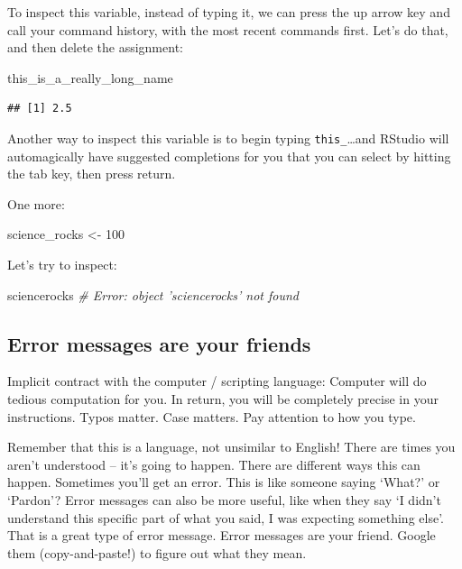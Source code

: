 \documentclass[]{book}
\newenvironment{Shaded}{\begin{snugshade}}{\end{snugshade}}
\newcommand{\DecValTok}[1]{\textcolor[rgb]{0.00,0.00,0.81}{{#1}}}
\newcommand{\StringTok}[1]{\textcolor[rgb]{0.31,0.60,0.02}{{#1}}}
\newcommand{\CommentTok}[1]{\textcolor[rgb]{0.56,0.35,0.01}{\textit{{#1}}}}
\newcommand{\NormalTok}[1]{{#1}}
\theoremstyle{definition}
\theoremstyle{definition}
\theoremstyle{definition}
\theoremstyle{remark}
\begin{document}
To inspect this variable, instead of typing it, we can press the up
arrow key and call your command history, with the most recent commands
first. Let's do that, and then delete the assignment:

\begin{Shaded}
\begin{Highlighting}[]
\NormalTok{this_is_a_really_long_name}
\end{Highlighting}
\end{Shaded}

\begin{verbatim}
## [1] 2.5
\end{verbatim}

Another way to inspect this variable is to begin typing
\texttt{this\_}\ldots{}and RStudio will automagically have suggested
completions for you that you can select by hitting the tab key, then
press return.

One more:

\begin{Shaded}
\begin{Highlighting}[]
\NormalTok{science_rocks <-}\StringTok{ }\DecValTok{100}
\end{Highlighting}
\end{Shaded}

Let's try to inspect:

\begin{Shaded}
\begin{Highlighting}[]
\NormalTok{sciencerocks}
\CommentTok{# Error: object 'sciencerocks' not found}
\end{Highlighting}
\end{Shaded}

\subsection{Error messages are your
friends}\label{error-messages-are-your-friends}

Implicit contract with the computer / scripting language: Computer will
do tedious computation for you. In return, you will be completely
precise in your instructions. Typos matter. Case matters. Pay attention
to how you type.

Remember that this is a language, not unsimilar to English! There are
times you aren't understood -- it's going to happen. There are different
ways this can happen. Sometimes you'll get an error. This is like
someone saying `What?' or `Pardon'? Error messages can also be more
useful, like when they say `I didn't understand this specific part of
what you said, I was expecting something else'. That is a great type of
error message. Error messages are your friend. Google them
(copy-and-paste!) to figure out what they mean.
\end{document}
